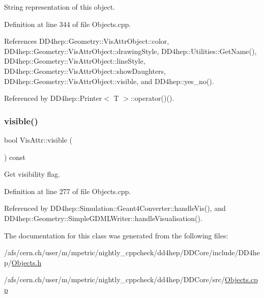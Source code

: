 String representation of this object. 



Definition at line 344 of file Objects.\+cpp.



References D\+D4hep\+::\+Geometry\+::\+Vis\+Attr\+Object\+::color, D\+D4hep\+::\+Geometry\+::\+Vis\+Attr\+Object\+::drawing\+Style, D\+D4hep\+::\+Utilities\+::\+Get\+Name(), D\+D4hep\+::\+Geometry\+::\+Vis\+Attr\+Object\+::line\+Style, D\+D4hep\+::\+Geometry\+::\+Vis\+Attr\+Object\+::show\+Daughters, D\+D4hep\+::\+Geometry\+::\+Vis\+Attr\+Object\+::visible, and D\+D4hep\+::yes\+\_\+no().



Referenced by D\+D4hep\+::\+Printer$<$ T $>$\+::operator()().

\hypertarget{class_d_d4hep_1_1_geometry_1_1_vis_attr_a0e7156c94d67d4a6ca80222154d3d03c}{}\label{class_d_d4hep_1_1_geometry_1_1_vis_attr_a0e7156c94d67d4a6ca80222154d3d03c} 
\subsubsection{\texorpdfstring{visible()}{visible()}}
{\footnotesize\ttfamily bool Vis\+Attr\+::visible (\begin{DoxyParamCaption}{ }\end{DoxyParamCaption}) const}



Get visibility flag. 



Definition at line 277 of file Objects.\+cpp.



Referenced by D\+D4hep\+::\+Simulation\+::\+Geant4\+Converter\+::handle\+Vis(), and D\+D4hep\+::\+Geometry\+::\+Simple\+G\+D\+M\+L\+Writer\+::handle\+Visualisation().



The documentation for this class was generated from the following files\+:\begin{DoxyCompactItemize}
\item 
/afs/cern.\+ch/user/m/mpetric/nightly\+\_\+cppcheck/dd4hep/\+D\+D\+Core/include/\+D\+D4hep/\hyperlink{_objects_8h}{Objects.\+h}\item 
/afs/cern.\+ch/user/m/mpetric/nightly\+\_\+cppcheck/dd4hep/\+D\+D\+Core/src/\hyperlink{_objects_8cpp}{Objects.\+cpp}\end{DoxyCompactItemize}
